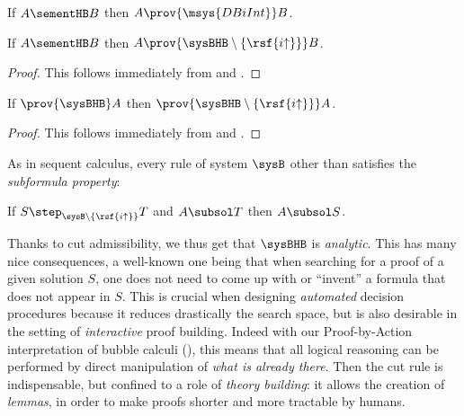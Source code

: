 \begin{fact}
  If $A \sementHB B$ then $A \prov{\msys{DBiInt}} B$.
\end{fact}

\begin{theorem}
  If $A \sementHB B$ then $A \prov{\sysBHB \setminus \{\rsf{i{\uparrow}}\}} B$.
\end{theorem}
\begin{proof}
  This follows immediately from  and
  .
\end{proof}

\begin{corollary}\label{cor:cut-admissibility}

  If $\prov{\sysBHB} A$ then $\prov{\sysBHB \setminus \{\rsf{i{\uparrow}}\}} A$.
\end{corollary}
\begin{proof}
  This follows immediately from  and
  .
\end{proof}

As in sequent calculus, every rule of system $\sysB$ other than
 satisfies the \emph{subformula property}:

\begin{fact}\label{cor:subformula-property}
  If $S \step_{\sysB \setminus \{\rsf{i{\uparrow}}\}} T$ and $A \subsol T$ then
  $A \subsol S$.
\end{fact}

Thanks to cut admissibility, we thus get that $\sysBHB$ is \emph{analytic}. This
has many nice consequences, a well-known one being that when searching for a
proof of a given solution $S$, one does not need to come up with or ``invent'' a
formula that does not appear in $S$. This is crucial when designing
\emph{automated} decision procedures because it reduces drastically the search
space, but is also desirable in the setting of \emph{interactive} proof
building. Indeed with our Proof-by-Action interpretation of bubble calculi
(), this means that all logical reasoning can be performed
by direct manipulation of \emph{what is already there}. Then the cut rule is
indispensable, but confined to a role of \emph{theory building}: it allows the
creation of \emph{lemmas}, in order to make proofs shorter and more tractable by
humans.

